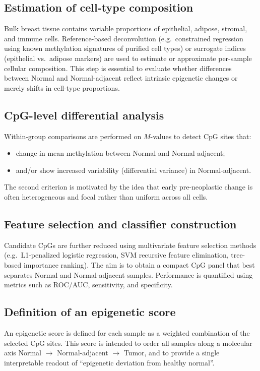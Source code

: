 \documentclass[10pt]{extarticle}
\begin{document}
\subsection{Estimation of cell-type composition}
Bulk breast tissue contains variable proportions of epithelial, adipose, stromal, and immune cells. Reference-based deconvolution (e.g.\ constrained regression using known methylation signatures of purified cell types) or surrogate indices (epithelial vs.\ adipose markers) are used to estimate or approximate per-sample cellular composition.  
This step is essential to evaluate whether differences between Normal and Normal-adjacent reflect intrinsic epigenetic changes or merely shifts in cell-type proportions.

\subsection{CpG-level differential analysis}
Within-group comparisons are performed on $M$-values to detect CpG sites that:
\begin{itemize}[label=-]
    \item change in mean methylation between Normal and Normal-adjacent;
    \item and/or show increased variability (differential variance) in Normal-adjacent.
\end{itemize}
The second criterion is motivated by the idea that early pre-neoplastic change is often heterogeneous and focal rather than uniform across all cells.

\subsection{Feature selection and classifier construction}
Candidate CpGs are further reduced using multivariate feature selection methods (e.g.\ L1-penalized logistic regression, SVM recursive feature elimination, tree-based importance ranking).  
The aim is to obtain a compact CpG panel that best separates Normal and Normal-adjacent samples.  
Performance is quantified using metrics such as ROC/AUC, sensitivity, and specificity.

\subsection{Definition of an epigenetic score}
An epigenetic score is defined for each sample as a weighted combination of the selected CpG sites.  
This score is intended to order all samples along a molecular axis Normal $\rightarrow$ Normal-adjacent $\rightarrow$ Tumor, and to provide a single interpretable readout of ``epigenetic deviation from healthy normal''.
\end{document}

